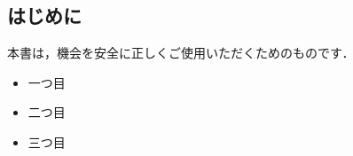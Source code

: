 %
%


\subsection{はじめに}

本書は，機会を安全に正しくご使用いただくためのものです．
\vspace*{-1em}
\begin{itemize}
  \item 一つ目
  \item 二つ目
  \item 三つ目
\end{itemize}


